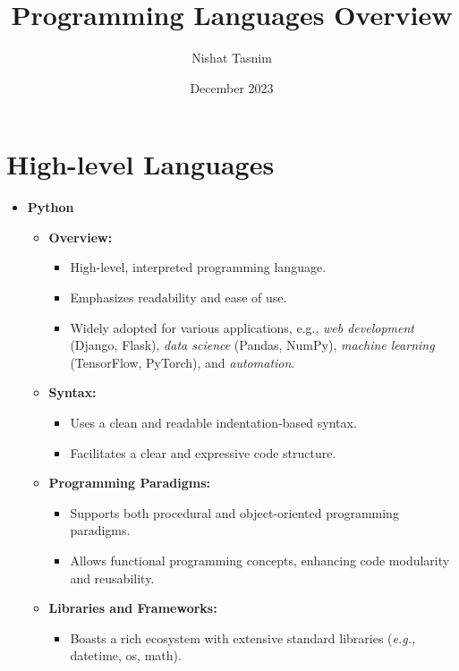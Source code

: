 \documentclass{article}
\title{Programming Languages Overview}
\author{Nishat Tasnim}
\date{December 2023}
\begin{document}
\maketitle

\section{High-level Languages}

\begin{itemize}
    \item \textbf{Python}
          \begin{itemize}
              \item \textbf{Overview:}
                    \begin{itemize}
                        \item High-level, interpreted programming language.
                        \item Emphasizes readability and ease of use.
                        \item Widely adopted for various applications, e.g., \textit{web development} (Django, Flask), \textit{data science} (Pandas, NumPy), \textit{machine learning} (TensorFlow, PyTorch), and \textit{automation}.
                    \end{itemize}
              \item \textbf{Syntax:}
                    \begin{itemize}
                        \item Uses a clean and readable indentation-based syntax.
                        \item Facilitates a clear and expressive code structure.
                    \end{itemize}
              \item \textbf{Programming Paradigms:}
                    \begin{itemize}
                        \item Supports both procedural and object-oriented programming paradigms.
                        \item Allows functional programming concepts, enhancing code modularity and reusability.
                    \end{itemize}
              \item \textbf{Libraries and Frameworks:}
                    \begin{itemize}
                        \item Boasts a rich ecosystem with extensive standard libraries (\textit{e.g.,} datetime, os, math).

\end{itemize}
\end{itemize}
\end{itemize}
\end{document}
